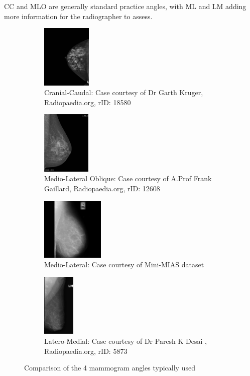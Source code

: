 CC and MLO are generally standard practice angles, with ML and LM adding more information for the radiographer to assess.
\begin{figure}[H]
\begin{center}
  \begin{subfigure}[t]{0.45\textwidth}
    \centering
        \includegraphics[height=3cm]{Chapter1/background-img/CC.jpg}
        \caption{Cranial-Caudal: Case courtesy of Dr Garth Kruger, Radiopaedia.org, rID: 18580}
        \label{fig:CC}
    \end{subfigure}
    \hfill
    \begin{subfigure}[t]{0.45\textwidth}
      \centering
          \includegraphics[height=3cm]{Chapter1/background-img/MLO.jpg}
          \caption{Medio-Lateral Oblique: Case courtesy of A.Prof Frank Gaillard, Radiopaedia.org, rID: 12608}
          \label{fig:MLO}
    \end{subfigure}
    \hspace*{\fill}


    \begin{subfigure}[t]{0.45\textwidth}
      \centering
          \includegraphics[height=3cm]{Chapter1/background-img/ML.jpg}
          \caption{Medio-Lateral: Case courtesy of Mini-MIAS dataset \cite{Suckling_1994}}
          \label{fig:LM}
    \end{subfigure}
    \hfill
    \begin{subfigure}[t]{0.45\textwidth}
      \centering
          \includegraphics[height=3cm]{Chapter1/background-img/LM.jpg}
          \caption{Latero-Medial: Case courtesy of Dr Paresh K Desai , Radiopaedia.org, rID: 5873}
          \label{fig:ML}
    \end{subfigure}
    \hspace*{\fill}
  \caption{Comparison of the 4 mammogram angles typically used}
  \label{fig:scan-angles}
\end{center}
\end{figure}
